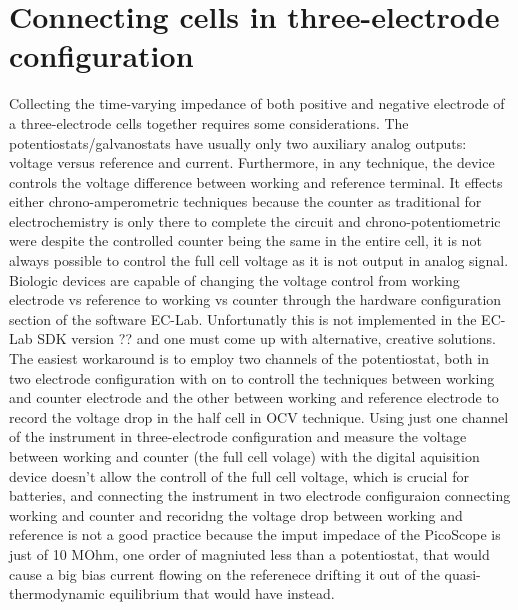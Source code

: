 \section{Connecting cells in three-electrode configuration}
Collecting the time-varying impedance of both positive and negative electrode of a three-electrode cells together requires some considerations. The potentiostats/galvanostats have usually only two auxiliary analog outputs: voltage versus reference and current. Furthermore, in any technique, the device controls the voltage difference between working and reference terminal. It effects either chrono-amperometric techniques because the counter as traditional for electrochemistry is only there to complete the circuit and chrono-potentiometric were despite the controlled counter being the same in the entire cell, it is not always possible to control the full cell voltage as it is not output in analog signal. Biologic devices are capable of changing the voltage control from working electrode vs reference to working vs counter through the hardware configuration section of the software EC-Lab. Unfortunatly this is not implemented in the EC-Lab SDK version ?? and one must come up with alternative, creative solutions. The easiest workaround is to employ two channels of the potentiostat, both in two electrode configuration with on to controll the techniques between working and counter electrode and the other between working and reference electrode to record the voltage drop in the half cell in OCV technique. 
Using just one channel of the instrument in three-electrode configuration and measure the voltage between working and counter (the full cell volage) with the digital aquisition device doesn't allow the controll of the full cell voltage, which is crucial for batteries, and connecting the instrument in two electrode configuraion connecting working and counter and recoridng the voltage drop between working and reference is not a good practice because the imput impedace of the PicoScope is just of 10 MOhm, one order of magniuted less than a potentiostat, that would cause a big bias current flowing on the referenece drifting it out of the quasi-thermodynamic equilibrium that would have instead.

